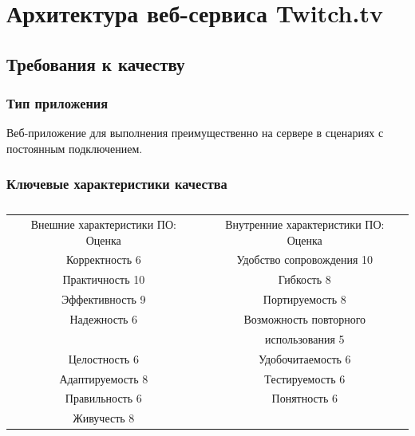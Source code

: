 \documentclass[a4paper]{report}
\begin{document}
\chapter*{Архитектура веб-сервиса Twitch.tv}

\section*{Требования к качеству}
\subsection*{Тип приложения}
Веб-приложение для выполнения преимущественно на сервере в сценариях с постоянным подключением.
\subsection*{Ключевые характеристики качества}
\begin{table}[h!]
  \centering
  \caption{}
  \label{t1}
  \begin{tabular}{|c|c|}
    \cline{1-2}
    Внешние характеристики ПО: Оценка  &Внутренние характеристики ПО:    Оценка\\ \cline{1-2}
    Корректность             6  & Удобство сопровождения               10\\ \cline{1-2}
    Практичность             10 & Гибкость                             8\\ \cline{1-2}
    Эффективность            9  & Портируемость                        8\\ \cline{1-2}
    Надежность               6  & Возможность повторного \tabularnewline & использования 5\\ \cline{1-2}
    Целостность              6  & Удобочитаемость                      6\\ \cline{1-2}
    Адаптируемость           8  & Тестируемость                        6\\ \cline{1-2}
    Правильность             6  & Понятность                           6\\ \cline{1-2}
    Живучесть                8  &  \\
    \cline{1-2}
  \end{tabular}
\end{table}
\end{document}
